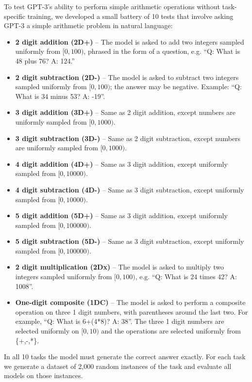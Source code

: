 
To test GPT-3's ability to perform simple arithmetic operations without task-specific training, we developed a small battery of 10 tests that involve asking GPT-3 a simple arithmetic problem in natural language:

\begin{itemize}
    \item \textbf{2 digit addition (2D+)} -- The model is asked to add two integers sampled uniformly from $[0, 100)$, phrased in the form of a question, e.g. ``Q: What is 48 plus 76? A: 124.''
    \item \textbf{2 digit subtraction (2D-)} -- The model is asked to subtract two integers sampled uniformly from $[0, 100)$; the answer may be negative.  Example: ``Q: What is 34 minus 53? A: -19''.
    \item \textbf{3 digit addition (3D+)} -- Same as 2 digit addition, except numbers are uniformly sampled from $[0, 1000)$.
    \item \textbf{3 digit subtraction (3D-)} -- Same as 2 digit subtraction, except numbers are uniformly sampled from $[0, 1000)$.
    \item \textbf{4 digit addition (4D+)} -- Same as 3 digit addition, except uniformly sampled from $[0, 10000)$.
    \item \textbf{4 digit subtraction (4D-)} -- Same as 3 digit subtraction, except uniformly sampled from $[0, 10000)$.
    \item \textbf{5 digit addition (5D+)} -- Same as 3 digit addition, except uniformly sampled from $[0, 100000)$.
    \item \textbf{5 digit subtraction (5D-)} -- Same as 3 digit subtraction, except uniformly sampled from $[0, 100000)$.
   \item \textbf{2 digit multiplication (2Dx)} -- The model is asked to multiply two integers sampled uniformly from $[0, 100)$, e.g. ``Q: What is 24 times 42? A: 1008''.
    \item \textbf{One-digit composite (1DC)} -- The model is asked to perform a composite operation on three 1 digit numbers, with parentheses around the last two. For example, ``Q: What is 6+(4*8)? A: 38''. The three 1 digit numbers are selected uniformly on $[0, 10)$ and the operations are selected uniformly from \{+,-,*\}.
\end{itemize}

In all 10 tasks the model must generate the correct answer exactly. For each task we generate a dataset of 2,000 random instances of the task and evaluate all models on those instances.

